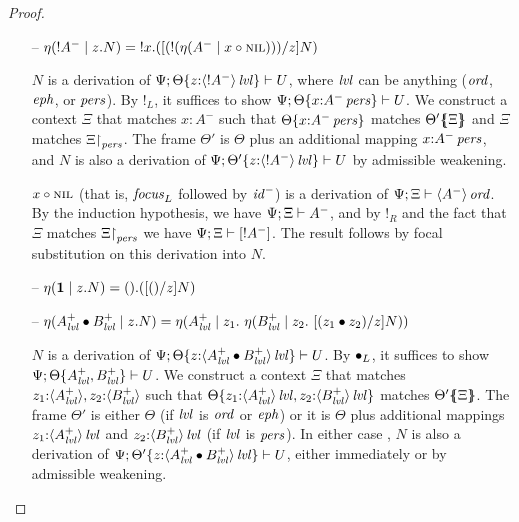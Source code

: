 \begin{proof}
\begin{itemize}
\item[--] $\etapa{z}{N}{{!}A^-}
           = \tbangl{x}{([(\tbangr{(\etana{\tfocusl{x}{\tnil}}{A^-})})/z]N)}$ 
  \smallskip

  $N$ is a derivation of 
  $\foc{\Psi}{\tackon{\Theta}{z{:}\islvl{\susp{{!}A^-}}}}{U}$, where
  $\mlvl$ can be anything ($\mtrue$, $\meph$, or $\mpers$).
  By ${!}_L$, it suffices to show 
  $\foc{\Psi}{\tackon{\Theta}{x{:}\ispers{A^-}}}{U}$.
  We construct a context $\Xi$ that matches $x{:}A^-$ such that
  $\tackon{\Theta}{x{:}\ispers{A^-}}$ matches $\frameoff{\Theta'}{\Xi}$
  and $\Xi$ matches $\restrictto{\Xi}{\mpers}$. The frame
  $\Theta'$ is $\Theta$ plus an additional mapping 
  $x{:}\ispers{A^-}$, and $N$ is also a derivation of 
  $\foc{\Psi}{\tackon{\Theta'}{z{:}\islvl{\susp{{!}A^-}}}}{U}$
  by admissible weakening.
  \smallskip

  $\tfocusl{x}{\tnil}$ (that is, ${\it focus}_L$ followed by
  ${\it id}^-$) is a derivation of $\foc{\Psi}{\Xi}{\istrue{\susp{A^-}}}$. 
  By the induction hypothesis, we have $\foc{\Psi}{\Xi}{A^-}$, 
  and by ${!}_R$ and the fact that $\Xi$ matches $\restrictto{\Xi}{\mpers}$
  we have $\foc{\Psi}{\Xi}{[{!}A^-]}$. The result follows
  by focal substitution on this derivation into $N$.
  \smallskip

\item[--] $\etapa{z}{N}{\one} = \tonel{([\toner/z]N)}$ 
\item[--] $\etapa{z}{N}{A^+_\mlvl \fuse B^+_\mlvl} =
            \etapa{z_1}
             {~\etapa{z_2}
              {~[(\tfuser{z_1}{z_2})/z]N}
              {B^+_\mlvl}}
             {A^+_\mlvl}$
  \smallskip

  $N$ is a derivation of 
  $\foc{\Psi}{\tackon{\Theta}
   {z{:}\islvl{\susp{A^+_\mlvl \fuse B^+_\mlvl}}}}{U}$. 
  By ${\fuse}_L$, it suffices to
  show $\foc{\Psi}{\tackon{\Theta}{A^+_\mlvl, B^+_\mlvl}}{U}$.
  We construct a context $\Xi$ that matches 
  $\matchconj{z_1{:}\susp{A^+_\mlvl}}{z_2{:}\susp{B^+_\mlvl}}$
  such that $\tackon{\Theta}
              {\mkconj{z_1{:}\islvl{\susp{A^+_\mlvl}}}
                      {z_2{:}\islvl{\susp{B^+_\mlvl}}}}$
  matches $\frameoff{\Theta'}{\Xi}$. The frame 
  $\Theta'$ is either $\Theta$ (if $\mlvl$ is $\mtrue$ or $\meph$) 
  or it is $\Theta$ plus additional mappings
  $z_1{:}\islvl{\susp{A^+_\mlvl}}$ and 
  $z_2{:}\islvl{\susp{B^+_\mlvl}}$ (if $\mlvl$ is $\mpers$). In either
  case , $N$ is also a derivation of 
  $\foc{\Psi}{\tackon{\Theta'}
   {z{:}\islvl{\susp{A^+_\mlvl \fuse B^+_\mlvl}}}}{U}$, either
  immediately or by admissible weakening.
  \smallskip



\end{itemize}
\end{proof}
